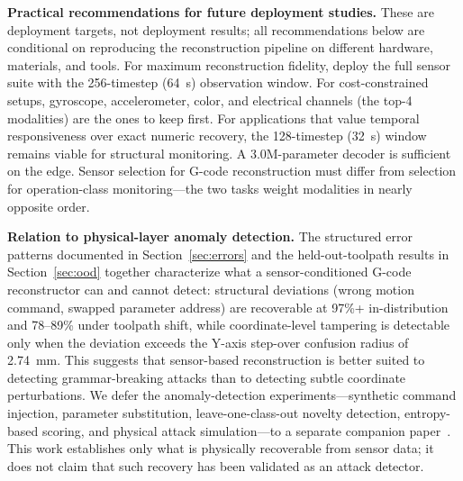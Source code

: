 \documentclass[sensors,article,submit,moreauthors,pdftex]{Definitions/mdpi}
\begin{document}
\textbf{Practical recommendations for future deployment studies.} These are deployment targets, not deployment results; all recommendations below are conditional on reproducing the reconstruction pipeline on different hardware, materials, and tools. For maximum reconstruction fidelity, deploy the full sensor suite with the 256-timestep (64~s) observation window. For cost-constrained setups, gyroscope, accelerometer, color, and electrical channels (the top-4 modalities) are the ones to keep first. For applications that value temporal responsiveness over exact numeric recovery, the 128-timestep (32~s) window remains viable for structural monitoring. A 3.0M-parameter decoder is sufficient on the edge. Sensor selection for G-code reconstruction must differ from selection for operation-class monitoring---the two tasks weight modalities in nearly opposite order.

\textbf{Relation to physical-layer anomaly detection.} The structured error patterns documented in Section~\ref{sec:errors} and the held-out-toolpath results in Section~\ref{sec:ood} together characterize what a sensor-conditioned G-code reconstructor can and cannot detect: structural deviations (wrong motion command, swapped parameter address) are recoverable at 97\%+ in-distribution and 78--89\% under toolpath shift, while coordinate-level tampering is detectable only when the deviation exceeds the Y-axis step-over confusion radius of 2.74~mm. This suggests that sensor-based reconstruction is better suited to detecting grammar-breaking attacks than to detecting subtle coordinate perturbations. We defer the anomaly-detection experiments---synthetic command injection, parameter substitution, leave-one-class-out novelty detection, entropy-based scoring, and physical attack simulation---to a separate companion paper~\cite{anomaly_paper}. This work establishes only what is physically recoverable from sensor data; it does not claim that such recovery has been validated as an attack detector.


\vspace{6pt}

\end{document}
